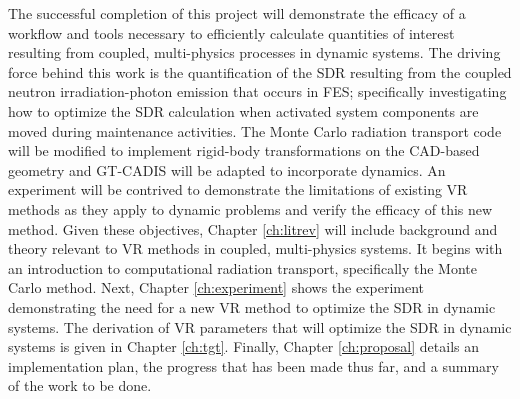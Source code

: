 The successful completion of this project will demonstrate the efficacy of a workflow and tools
necessary to efficiently calculate quantities of interest resulting from
coupled, multi-physics processes in dynamic systems.  
The driving force behind this work is the quantification of the
SDR resulting from the coupled neutron
irradiation-photon emission that occurs in FES;
specifically investigating how to optimize the SDR calculation when %
activated system components are moved during maintenance activities.
The Monte Carlo radiation transport code will
be modified to implement rigid-body transformations on the CAD-based geometry
and GT-CADIS will be adapted to
incorporate dynamics.  An experiment will be contrived to demonstrate the
limitations of existing VR methods as they apply to dynamic problems and verify
the efficacy of this new method.  Given these objectives, Chapter \ref{ch:litrev}
will include background and theory relevant to VR methods in coupled,
multi-physics systems.  
It begins with an introduction to computational
radiation transport, specifically the Monte Carlo method.
Next, Chapter \ref{ch:experiment} shows the experiment demonstrating the need
for a new VR method to optimize the SDR in dynamic systems.  The derivation of
VR parameters that will optimize the SDR in dynamic systems is given in
Chapter \ref{ch:tgt}. Finally, Chapter \ref{ch:proposal} details an implementation plan, 
the progress that has been made thus far, and a summary of the
work to be done.
